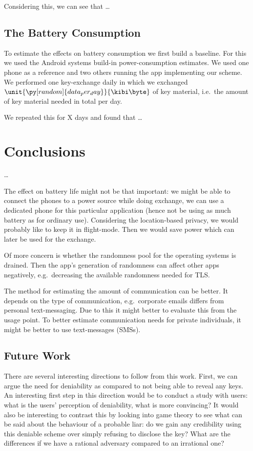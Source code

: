 Considering this, we can see that \dots

\subsection{The Battery Consumption}
\label{sec:Battery}
To estimate the effects on battery consumption we first build a baseline.
For this we used the Android systems build-in power-consumption estimates.
We used one phone as a reference and two others running the app implementing 
our scheme.
We performed one key-exchange daily in which we exchanged 
\(\unit{\py[random]{data_per_day}}{\kibi\byte}\) of key material, i.e.~the 
amount of key material needed in total per day.

We repeated this for X days and found that \dots


\section{Conclusions}
\label{sec:Conclusions}

\dots

The effect on battery life might not be that important: we might be able to 
connect the phones to a power source while doing exchange, we can use 
a dedicated phone for this particular application (hence not be using as much 
battery as for ordinary use).
Considering the location-based privacy, we would probably like to keep it in 
flight-mode.
Then we would save power which can later be used for the exchange.

Of more concern is whether the randomness pool for the operating systems is 
drained.
Then the app's generation of randomness can affect other apps negatively, 
e.g.~decreasing the available randomness needed for TLS\@.

The method for estimating the amount of communication can be better.
It depends on the type of communication, e.g.~corporate emails differs from 
personal text-messaging.
Due to this it might better to evaluate this from the usage point.
To better estimate communication needs for private individuals, it might be 
better to use text-messages (SMSs).

\subsection{Future Work}

There are several interesting directions to follow from this work.
First, we can argue the need for deniability as compared to not being able to 
reveal any keys.
An interesting first step in this direction would be to conduct a study with 
users: what is the users' perception of deniability, what is more convincing?
It would also be interesting to contrast this by looking into game theory to 
see what can be said about the behaviour of a probable liar: do we gain any 
credibility using this deniable scheme over simply refusing to disclose the 
key?
What are the differences if we have a rational adversary compared to an 
irrational one?

